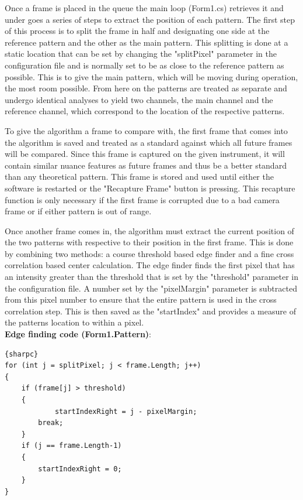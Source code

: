 \documentclass{article}
\begin{document}
Once a frame is placed in the queue the main loop (Form1.cs) retrieves it and under goes a series of steps to extract the position of each pattern. The first step of this process is to split the frame in half and designating one side at the reference pattern and the other as the main pattern. This splitting is done at a static location that can be set by changing the "splitPixel" parameter in the configuration file and is normally set to be as close to the reference pattern as possible. This is to give the main pattern, which will be moving during operation, the most room possible. From here on the patterns are treated as separate and undergo identical analyses to yield two channels, the main channel and the reference channel, which correspond to the location of the respective patterns.

To give the algorithm a frame to compare with, the first frame that comes into the algorithm is saved and treated as a standard against which all future frames will be compared. Since this frame is captured on the given instrument, it will contain similar nuance features as future frames and thus be  a better standard than any theoretical pattern. This frame is stored and used until either the software is restarted or the "Recapture Frame" button is pressing. This recapture function is only necessary if the first frame is corrupted due to a bad camera frame or if either pattern is out of range.

Once another frame comes in, the algorithm must extract the current position of the two patterns with respective to their position in the first frame. This is done by combining two methods: a course threshold based edge finder and a fine cross correlation based center calculation. The edge finder finds the first pixel that has an intensity greater than the threshold that is set by the "threshold" parameter in the configuration file. A number set by the "pixelMargin" parameter is subtracted from this pixel number to ensure that the entire pattern is used in the cross correlation step. This is then saved as the "startIndex" and provides a measure of the patterns location to within a pixel. \\

\textbf{Edge finding code (Form1.Pattern)}:
\begin{lstlisting}{sharpc}                    
for (int j = splitPixel; j < frame.Length; j++)
{
	if (frame[j] > threshold)
	{
    		startIndexRight = j - pixelMargin;
		break;
	}
	if (j == frame.Length-1)
	{
		startIndexRight = 0;
	}
}
\end{lstlisting}
\end{document}
